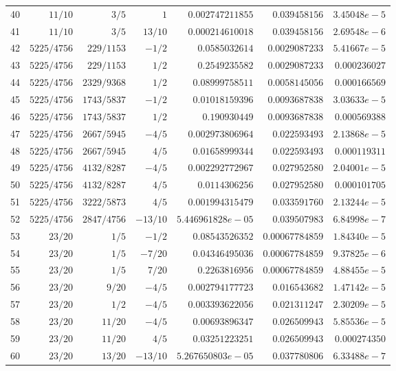 \documentclass[11pt,reqno]{amsart}
\numberwithin{equation}{section}
\theoremstyle{definition}
\theoremstyle{remark}
\begin{document}
\begin{center}
\begin{longtable}{@{}rrrrrrr@{}}
40 & $11/10$ & $3/5$ & $1$ & $0.002747211855$ & $0.039458156$ & $3.45048e-5$\\
41 & $11/10$ & $3/5$ & $13/10$ & $0.000214610018$ & $0.039458156$ & $2.69548e-6$\\
42 & $5225/4756$ & $229/1153$ & $-1/2$ & $0.0585032614$ & $0.0029087233$ & $5.41667e-5$\\
43 & $5225/4756$ & $229/1153$ & $1/2$ & $0.2549235582$ & $0.0029087233$ & $0.000236027$\\
44 & $5225/4756$ & $2329/9368$ & $1/2$ & $0.08999758511$ & $0.0058145056$ & $0.000166569$\\
45 & $5225/4756$ & $1743/5837$ & $-1/2$ & $0.01018159396$ & $0.0093687838$ & $3.03633e-5$\\
46 & $5225/4756$ & $1743/5837$ & $1/2$ & $0.190930449$ & $0.0093687838$ & $0.000569388$\\
47 & $5225/4756$ & $2667/5945$ & $-4/5$ & $0.002973806964$ & $0.022593493$ & $2.13868e-5$\\
48 & $5225/4756$ & $2667/5945$ & $4/5$ & $0.01658999344$ & $0.022593493$ & $0.000119311$\\
49 & $5225/4756$ & $4132/8287$ & $-4/5$ & $0.002292772967$ & $0.027952580$ & $2.04001e-5$\\
50 & $5225/4756$ & $4132/8287$ & $4/5$ & $0.0114306256$ & $0.027952580$ & $0.000101705$\\
51 & $5225/4756$ & $3222/5873$ & $4/5$ & $0.001994315479$ & $0.033591760$ & $2.13244e-5$\\
52 & $5225/4756$ & $2847/4756$ & $-13/10$ & $5.446961828e-05$ & $0.039507983$ & $6.84998e-7$\\
53 & $23/20$ & $1/5$ & $-1/2$ & $0.08543526352$ & $0.00067784859$ & $1.84340e-5$\\
54 & $23/20$ & $1/5$ & $-7/20$ & $0.04346495036$ & $0.00067784859$ & $9.37825e-6$\\
55 & $23/20$ & $1/5$ & $7/20$ & $0.2263816956$ & $0.00067784859$ & $4.88455e-5$\\
56 & $23/20$ & $9/20$ & $-4/5$ & $0.002794177723$ & $0.016543682$ & $1.47142e-5$\\
57 & $23/20$ & $1/2$ & $-4/5$ & $0.003393622056$ & $0.021311247$ & $2.30209e-5$\\
58 & $23/20$ & $11/20$ & $-4/5$ & $0.00693896347$ & $0.026509943$ & $5.85536e-5$\\
59 & $23/20$ & $11/20$ & $4/5$ & $0.03251223251$ & $0.026509943$ & $0.000274350$\\
60 & $23/20$ & $13/20$ & $-13/10$ & $5.267650803e-05$ & $0.037780806$ & $6.33488e-7$\\

\end{longtable}
\end{center}
\end{document}
